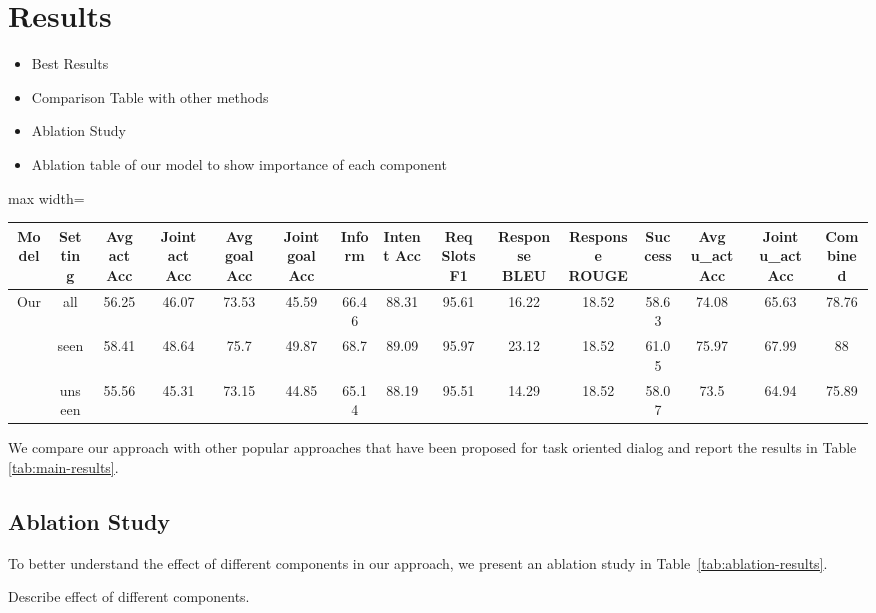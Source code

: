 
\section{Results}


\begin{itemize}
    \item Best Results
    \item Comparison Table with other methods
    \item Ablation Study
    \item Ablation table of our model to show importance of each component
\end{itemize}

\begin{table*}
    \centering
    \begin{adjustbox}{max width=\textwidth}
        \begin{tabular}{|c|c|c|c|c|c|c|c|c|c|c|c|c|c|c|}
            \hline
            Model                & Setting & Avg act Acc & Joint act Acc & Avg goal Acc & Joint goal Acc & Inform & Intent Acc & Req Slots F1 & Response BLEU & Response ROUGE & Success & Avg u\_act Acc & Joint u\_act Acc & Combined \\ \hline
            \multirow{3}{*}{Our} & all     & 56.25       & 46.07         & 73.53        & 45.59          & 66.46  & 88.31      & 95.61        & 16.22         & 18.52          & 58.63   & 74.08          & 65.63            & 78.76    \\ \cline{2-15}
                                 & seen    & 58.41       & 48.64         & 75.7         & 49.87          & 68.7   & 89.09      & 95.97        & 23.12         & 18.52          & 61.05   & 75.97          & 67.99            & 88       \\ \cline{2-15}
                                 & unseen  & 55.56       & 45.31         & 73.15        & 44.85          & 65.14  & 88.19      & 95.51        & 14.29         & 18.52          & 58.07   & 73.5           & 64.94            & 75.89    \\ \hline
        \end{tabular}
    \end{adjustbox}
    \caption{Main Results}
    \label{tab:main-results}
\end{table*}


We compare our approach with other popular approaches that have been proposed for task oriented dialog and report the results in
Table \ref{tab:main-results}.

\subsection{Ablation Study}

To better understand the effect of different components in our approach, we present an ablation study in Table~\ref{tab:ablation-results}.


Describe effect of different components.

